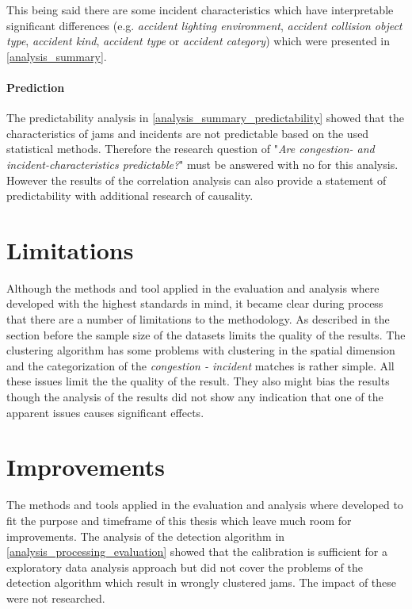 This being said there are some incident characteristics which have interpretable significant differences (e.g. \textit{accident lighting environment}, \textit{accident collision object type}, \textit{accident kind}, \textit{accident type} or \textit{accident category}) which were presented in \cref{analysis_summary}.

\paragraph{Prediction} The predictability analysis in \cref{analysis_summary_predictability} showed that the characteristics of jams and incidents are not predictable based on the used statistical methods. Therefore the research question of "\textit{Are congestion- and incident-characteristics predictable?}" must be answered with no for this analysis. However the results of the correlation analysis can also provide a statement of predictability with additional research of causality.

\section{Limitations}
Although the methods and tool applied in the evaluation and analysis where developed with the highest standards in mind, it became clear during process that there are a number of limitations to the methodology. As described in the section before the sample size of the datasets limits the quality of the results. The clustering algorithm has some problems with clustering in the spatial dimension and the categorization of the \textit{congestion - incident} matches is rather simple. All these issues limit the the quality of the result. They also might bias the results though the analysis of the results did not show any indication that one of the apparent issues causes significant effects.

\section{Improvements} 
The methods and tools applied in the evaluation and analysis where developed to fit the purpose and timeframe of this thesis which leave much room for improvements. The analysis of the detection algorithm in \cref{analysis_processing_evaluation} showed that the calibration is sufficient for a exploratory data analysis approach but did not cover the problems of the detection algorithm which result in wrongly clustered jams. The impact of these were not researched.

